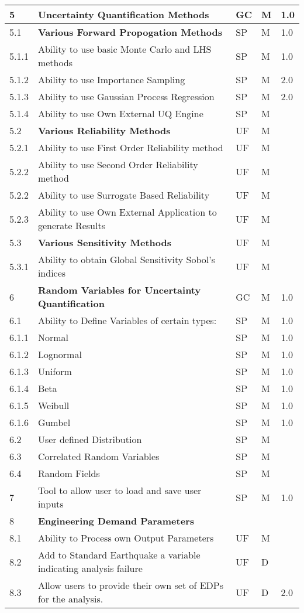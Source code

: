 \begin{longtable}{| p{} | p{} | p{} | p{} |  p{} |}
	5 & \textbf{Uncertainty Quantification Methods} &  GC & M & 1.0  \\ \hline
	5.1 & \textbf{Various Forward Propogation Methods} & SP & M & 1.0  \\ \hline
	5.1.1 & Ability to use basic  Monte Carlo and LHS methods & SP & M & 1.0 \\ \hline
	5.1.2 & Ability to use Importance Sampling  & SP & M & 2.0 \\ \hline
	5.1.3 & Ability to use Gaussian Process Regression & SP & M & 2.0 \\ \hline
	5.1.4 & Ability to use Own External UQ Engine & SP & M &  \\ \hline
	5.2 & \textbf{Various Reliability Methods} & UF & M &  \\ \hline
	5.2.1 & Ability to use First Order Reliability method & UF & M &  \\ \hline
	5.2.2 & Ability to use Second Order Reliability method & UF & M & \\ \hline
	5.2.2 & Ability to use Surrogate Based Reliability & UF & M & \\ \hline
	5.2.3 & Ability to use Own External Application to generate Results & UF & M &  \\ \hline
	5.3 & \textbf{Various Sensitivity Methods} & UF & M &  \\ \hline
	5.3.1 & Ability to obtain Global Sensitivity Sobol's indices & UF & M &  \\ \hline
    6 & \textbf{Random Variables for Uncertainty Quantification} & GC & M & 1.0  \\ \hline
    6.1 & Ability to Define Variables of certain types: & SP & M & 1.0  \\ 
    6.1.1 & Normal & SP & M  & 1.0 \\ \hline
    6.1.2 & Lognormal & SP & M & 1.0 \\ \hline
    6.1.3 & Uniform & SP & M & 1.0  \\ \hline
    6.1.4 & Beta & SP & M & 1.0 \\ \hline
    6.1.5 & Weibull &  SP & M  & 1.0 \\ \hline
    6.1.6 & Gumbel &  SP & M & 1.0  \\ \hline
    6.2 & User defined Distribution & SP & M &  \\ \hline
    6.3 & Correlated Random Variables & SP & M &  \\ \hline
    6.4 & Random Fields & SP & M &  \\ \hline
     7 & Tool to allow user to load and save user inputs & SP & M & 1.0 \\ \hline
    8 & \textbf{Engineering Demand Parameters} &  &  \\ \hline
    8.1 & Ability to Process own Output Parameters & UF & M &   \\ \hline
    8.2 & Add to Standard Earthquake a variable indicating analysis failure & UF & D &   \\ \hline
    8.3 & Allow users to provide their own set of EDPs for the analysis. & UF & D & 2.0\\ \hline


\end{longtable}

